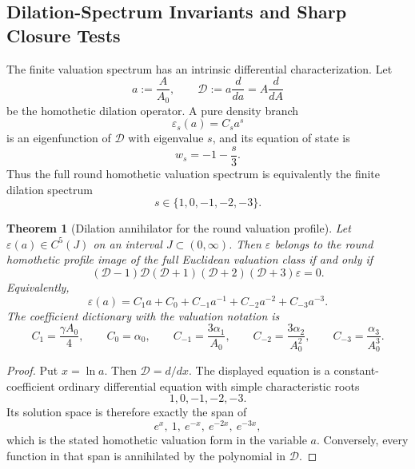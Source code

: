 \documentclass[11pt,a4paper]{article}
\def\dd{d}%
\numberwithin{equation}{section}
\newtheorem{theorem}[criterion]{Theorem}
\theoremstyle{remark}
\newcommand{\Dil}{\mathscr{D}}
\newcommand{\dd}{\mathrm{d}}
\begin{document}
\subsection{Dilation-Spectrum Invariants and Sharp Closure Tests}
The finite valuation spectrum has an intrinsic differential characterization. Let
\begin{equation}
a:=\frac{A}{A_0},
\qquad
\Dil:=a\frac{\dd}{\dd a}=A\frac{\dd}{\dd A}
\end{equation}
be the homothetic dilation operator. A pure density branch
\begin{equation}
\varepsilon_s(a)=C_s a^s
\end{equation}
is an eigenfunction of \(\Dil\) with eigenvalue \(s\), and its equation of state is
\begin{equation}
w_s=-1-\frac{s}{3}.
\end{equation}
Thus the full round homothetic valuation spectrum is equivalently the finite dilation spectrum
\begin{equation}
s\in\{1,0,-1,-2,-3\}.
\end{equation}

\begin{theorem}[Dilation annihilator for the round valuation profile]
Let \(\varepsilon(a)\in C^5(J)\) on an interval \(J\subset(0,\infty)\). Then \(\varepsilon\) belongs to the round homothetic profile image of the full Euclidean valuation class if and only if
\begin{equation}
\boxed{
(\Dil-1)\Dil(\Dil+1)(\Dil+2)(\Dil+3)\varepsilon=0 .
}
\end{equation}
Equivalently,
\begin{equation}
\varepsilon(a)=
C_1a+C_0+C_{-1}a^{-1}+C_{-2}a^{-2}+C_{-3}a^{-3}.
\end{equation}
The coefficient dictionary with the valuation notation is
\begin{equation}
C_1=\frac{\gamma A_0}{4},
\qquad
C_0=\alpha_0,
\qquad
C_{-1}=\frac{3\alpha_1}{A_0},
\qquad
C_{-2}=\frac{3\alpha_2}{A_0^2},
\qquad
C_{-3}=\frac{\alpha_3}{A_0^3}.
\end{equation}
\end{theorem}
\begin{proof}
Put \(x=\ln a\). Then \(\Dil=\dd/\dd x\). The displayed equation is a constant-coefficient ordinary differential equation with simple characteristic roots
\begin{equation}
1,0,-1,-2,-3.
\end{equation}
Its solution space is therefore exactly the span of
\begin{equation}
e^x,\ 1,\ e^{-x},\ e^{-2x},\ e^{-3x},
\end{equation}
which is the stated homothetic valuation form in the variable \(a\). Conversely, every function in that span is annihilated by the polynomial in \(\Dil\).
\end{proof}
\end{document}
